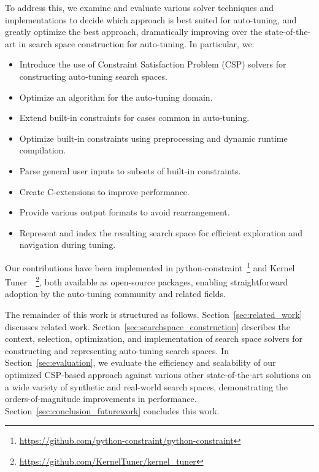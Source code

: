 To address this, we examine and evaluate various solver techniques and implementations to decide which approach is best suited for auto-tuning, and greatly optimize the best approach, dramatically improving over the state-of-the-art in search space construction for auto-tuning.
In particular, we: 
\begin{itemize}
    \item Introduce the use of Constraint Satisfaction Problem (CSP) solvers for constructing auto-tuning search spaces.
    \item Optimize an algorithm for the auto-tuning domain.
    \item Extend built-in constraints for cases common in auto-tuning.
    \item Optimize built-in constraints using preprocessing and dynamic runtime compilation. 
    \item Parse general user inputs to subsets of built-in constraints.
    \item Create C-extensions to improve performance. 
    \item Provide various output formats to avoid rearrangement. 
    \item Represent and index the resulting search space for efficient exploration and navigation during tuning.
\end{itemize}
Our contributions have been implemented in python-constraint~\footnote{\url{https://github.com/python-constraint/python-constraint}} and Kernel Tuner~\cite{vanwerkhovenKernelTunerSearchoptimizing2019}~\footnote{\url{https://github.com/KernelTuner/kernel_tuner}}, both available as open-source packages, enabling straightforward adoption by the auto-tuning community and related fields.

The remainder of this work is structured as follows.
Section~\ref{sec:related_work} discusses related work.
Section~\ref{sec:searchspace_construction} describes the context, selection, optimization, and implementation of search space solvers for constructing and representing auto-tuning search spaces.
In Section~\ref{sec:evaluation}, we evaluate the efficiency and scalability of our optimized CSP-based approach against various other state-of-the-art solutions on a wide variety of synthetic and real-world search spaces, demonstrating the orders-of-magnitude improvements in performance. 
Section~\ref{sec:conclusion_futurework} concludes this work.
